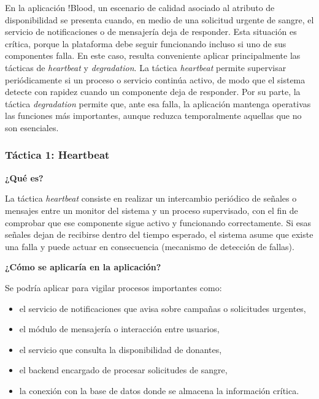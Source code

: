 En la aplicación !Blood, un escenario de calidad asociado al atributo de disponibilidad se presenta cuando, en medio de una solicitud urgente de sangre, el servicio de notificaciones o de mensajería deja de responder. Esta situación es crítica, porque la plataforma debe seguir funcionando incluso si uno de sus componentes falla. En este caso, resulta conveniente aplicar principalmente las tácticas de \textit{heartbeat} y \textit{degradation}. La táctica \textit{heartbeat} permite supervisar periódicamente si un proceso o servicio continúa activo, de modo que el sistema detecte con rapidez cuando un componente deja de responder. Por su parte, la táctica \textit{degradation} permite que, ante esa falla, la aplicación mantenga operativas las funciones más importantes, aunque reduzca temporalmente aquellas que no son esenciales.

\subsubsection{Táctica 1: Heartbeat}

\noindent\textbf{¿Qué es?}

La táctica \textit{heartbeat} consiste en realizar un intercambio periódico de señales o mensajes entre un monitor del sistema y un proceso supervisado, con el fin de comprobar que ese componente sigue activo y funcionando correctamente. Si esas señales dejan de recibirse dentro del tiempo esperado, el sistema asume que existe una falla y puede actuar en consecuencia (mecanismo de detección de fallas).

\medskip
\noindent\textbf{¿Cómo se aplicaría en la aplicación?}

Se podría aplicar para vigilar procesos importantes como:

\begin{itemize}
    \item el servicio de notificaciones que avisa sobre campañas o solicitudes urgentes,
    \item el módulo de mensajería o interacción entre usuarios,
    \item el servicio que consulta la disponibilidad de donantes,
    \item el backend encargado de procesar solicitudes de sangre,
    \item la conexión con la base de datos donde se almacena la información crítica.
\end{itemize}

